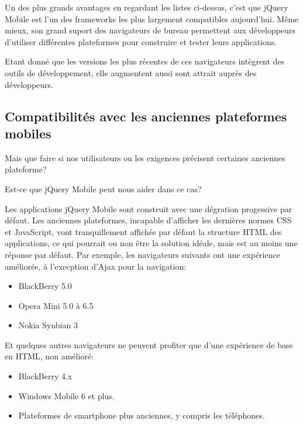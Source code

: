 Un des plus grands avantages en regardant les listes ci-dessus, c’est que jQuery Mobile est l’un des frameworks les plus largement compatibles aujourd’hui. Même mieux, son grand suport des navigateurs de bureau permettent aux développeurs d’utiliser différentes plateformes pour construire et tester leurs applications.

Etant donné que les versions les plus récentes de ces navigateurs intègrent des outils de développement, elle augmentent aussi sont attrait auprès des développeurs.

\subsection{Compatibilités avec les anciennes plateformes mobiles}

Mais que faire si nos utilisateurs ou les exigences précisent certaines anciennes plateforme?

Est-ce que jQuery Mobile peut nous aider dans ce cas?

Les applications jQuery Mobile sont construit avec une dégration progessive par défaut. Les anciennes plateformes, incapable d’afficher les dernières normes CSS et JavaScript, vont tranquillement affichés par défaut la structure HTML des applications, ce qui pourrait ou non être la solution idéale, mais est au moins une réponse par défaut.
Par exemple, les navigateurs suivants ont une expérience améliorée, à l’execption d’Ajax pour la navigation:

\begin{itemize}
  \item[\textbullet]
  BlackBerry 5.0
  
  \item[\textbullet]
  Opera Mini 5.0 à 6.5
  
  \item[\textbullet]
  Nokia Synbian 3
\end{itemize}

Et quelques autres navigateurs ne peuvent profiter que d’une expérience de base en HTML, non amélioré:

\begin{itemize}
  \item[\textbullet]
  BlackBerry 4.x
  
  \item[\textbullet]
  Windows Mobile 6 et plus.
  
  \item[\textbullet]
  Plateformes de smartphone plus anciennes, y compris les téléphones.
  
\end{itemize}


